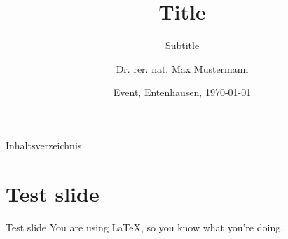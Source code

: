 \documentclass{TIBbeamer}
\title{Title}
\subtitle{Subtitle}
\author{Dr.\:\! rer.\:\! nat.\:\! Max Mustermann}
\date{Event, Entenhausen, \today}
\begin{document}

\begin{frame}
\thispagestyle{empty}
\titlepage
\end{frame}


\begin{frame}{Inhaltsverzeichnis}
\thispagestyle{empty}
\tableofcontents
\end{frame}


\section{Test slide}
\begin{frame}{Test slide}
You are using \LaTeX, so you know what you're doing.
\end{frame}

\end{document}
